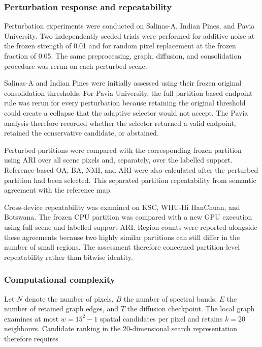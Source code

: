 \documentclass[10pt,a4paper,fleqn]{article}
\begin{document}
\subsubsection{Perturbation response and repeatability}

Perturbation experiments were conducted on Salinas-A, Indian Pines, and Pavia
University. Two independently seeded trials were performed for additive noise
at the frozen strength of 0.01 and for random pixel replacement at the frozen
fraction of 0.05. The same preprocessing, graph, diffusion, and consolidation
procedure was rerun on each perturbed scene.

Salinas-A and Indian Pines were initially assessed using their frozen original
consolidation thresholds. For Pavia University, the full partition-based endpoint
rule was rerun for every perturbation because retaining the original threshold
could create a collapse that the adaptive selector would not accept. The
Pavia analysis therefore recorded whether the selector returned a valid
endpoint, retained the conservative candidate, or abstained.

Perturbed partitions were compared with the corresponding frozen partition
using ARI over all scene pixels and, separately, over the labelled support.
Reference-based OA, BA, NMI, and ARI were also calculated after the perturbed
partition had been selected. This separated partition repeatability from
semantic agreement with the reference map.

Cross-device repeatability was examined on KSC, WHU-Hi HanChuan, and Botswana.
The frozen CPU partition was compared with a new GPU execution using full-scene
and labelled-support ARI. Region counts were reported alongside these
agreements because two highly similar partitions can still differ in the
number of small regions. The assessment therefore concerned partition-level
repeatability rather than bitwise identity.

\subsubsection{Computational complexity}

Let \(N\) denote the number of pixels, \(B\) the number of spectral bands,
\(E\) the number of retained graph edges, and \(T\) the diffusion checkpoint.
The local graph examines at most \(w=15^{2}-1\) spatial candidates per pixel
and retains \(k=20\) neighbours. Candidate ranking in the 20-dimensional
search representation therefore requires
\end{document}
